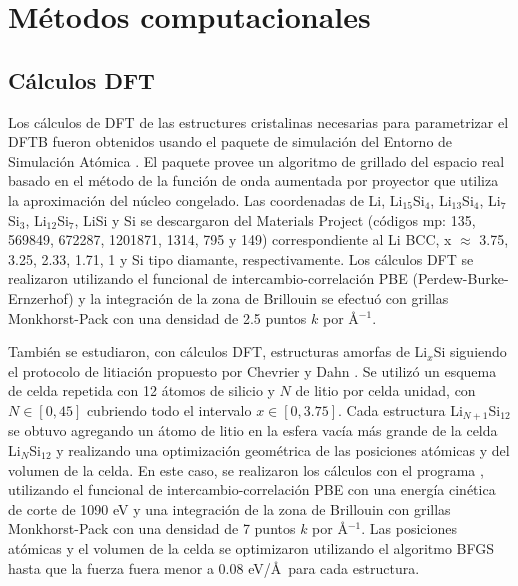 \section{Métodos computacionales}

\subsection{Cálculos DFT}\label{s:dftcalc}

Los cálculos de DFT de las estructures cristalinas necesarias para parametrizar el DFTB fueron obtenidos usando el 
paquete de simulación  \cite{enkovaara2010, mortensen2005} del 
Entorno de Simulación Atómica \cite{larsen2017}. El paquete  provee un 
algoritmo de grillado del espacio real basado en el método de la función de onda 
aumentada por proyector \cite{blochl1994} que utiliza la aproximación del núcleo 
congelado. Las coordenadas de Li, Li$_{15}$Si$_{4}$, Li$_{13}$Si$_{4}$, 
Li$_{7}$Si$_{3}$, Li$_{12}$Si$_{7}$, LiSi y Si se descargaron del Materials 
Project \cite{materials_project} (códigos mp: 135, 569849, 672287, 1201871, 1314, 
795 y 149) correspondiente al Li BCC, x $\approx$ 3.75, 3.25, 2.33, 1.71, 1 y
Si tipo diamante, respectivamente. Los cálculos DFT se realizaron utilizando el 
funcional de intercambio-correlación PBE (Perdew-Burke-Ernzerhof) y la integración
de la zona de Brillouin se efectuó con grillas Monkhorst-Pack con una densidad
de 2.5 puntos $k$ por \AA$^{-1}$.

También se estudiaron, con cálculos DFT, estructuras amorfas de Li$_x$Si siguiendo
el protocolo de litiación propuesto por Chevrier y Dahn \cite{chevrier2009, 
chevrier2010}. Se utilizó un esquema de celda repetida con 12 átomos de silicio y 
$N$ de litio por celda unidad, con $N\in[0,45]$ cubriendo todo el intervalo 
$x\in[0,3.75]$. Cada estructura Li$_{N+1}$Si$_{12}$ se obtuvo agregando un átomo 
de litio en la esfera vacía más grande de la celda Li$_{N}$Si$_{12}$ y realizando
una optimización geométrica de las posiciones atómicas y del volumen de la celda.
En este caso, se realizaron los cálculos con el programa  
 \cite{quantum_espresso,quantum_espresso_advanced}, utilizando el 
funcional de intercambio-correlación PBE con una energía cinética de corte de 
1090 eV y una integración de la zona de Brillouin con grillas Monkhorst-Pack con 
una densidad de 7 puntos $k$ por \AA$^{-1}$. Las posiciones atómicas y el volumen 
de la celda se optimizaron utilizando el algoritmo BFGS hasta que la fuerza fuera 
menor a 0.08 eV/\AA\ para cada estructura.


